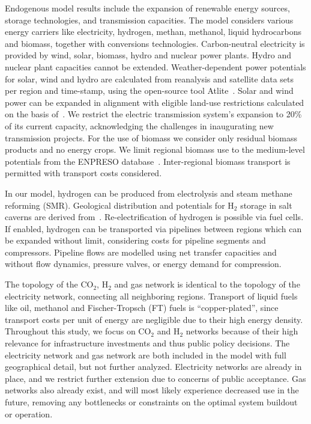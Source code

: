 \documentclass[twocolumn]{article}
\newcommand{\carbon}{CO$_2$}
\newcommand{\hydrogen}{H$_2$}
\begin{document}
Endogenous model results include the expansion of renewable energy sources, storage technologies, and transmission capacities.
The model considers various energy carriers like electricity, hydrogen, methan, methanol, liquid hydrocarbons and biomass, together with conversions technologies.
Carbon-neutral electricity is provided by wind, solar, biomass, hydro and nuclear power plants. Hydro and nuclear plant capacities cannot be extended. Weather-dependent power potentials for solar, wind and hydro are calculated from reanalysis and satellite data sets~\cite{hersbachERA5GlobalReanalysis2020,pfeifrothSurfaceRadiationData2017}  per region and time-stamp, using the open-source tool Atlite~\cite{hofmannAtliteLightweightPython2021}.
Solar and wind power can be expanded in alignment with eligible land-use restrictions calculated on the basis of~\cite{eeaCorineLandCover2012,eeaNatura2000Data2016}. We restrict the electric transmission system's expansion to 20\% of its current capacity, acknowledging the challenges in inaugurating new transmission projects.
For the use of biomass we consider only residual biomass products and no energy crops. We limit regional biomass use to the medium-level potentials from the ENPRESO database~\cite{enspreso_database,instituteforenergyandtransportjointresearchcentreJRCEUTIMESModelBioenergy2015}. Inter-regional biomass transport is permitted with transport costs considered.

In our model, hydrogen can be produced from electrolysis and steam methane reforming (SMR). Geological distribution and potentials for \hydrogen{} storage in salt caverns are derived from~\cite{caglayanTechnicalPotentialSalt2020}. Re-electrification of hydrogen is possible via fuel cells. If enabled, hydrogen can be transported via pipelines between regions which can be expanded without limit, considering costs for pipeline segments and compressors. Pipeline flows are modelled using net transfer capacities and without flow dynamics, pressure valves, or energy demand for compression.

The topology of the \carbon{}, \hydrogen{} and gas network is identical to the topology of the electricity network, connecting all neighboring regions. Transport of liquid fuels like oil, methanol and Fischer-Tropsch (FT) fuels is ``copper-plated'', since transport costs per unit of energy are negligible due to their high energy density. Throughout this study, we focus on \carbon{} and \hydrogen{} networks because of their high relevance for infrastructure investments and thus public policy decisions. The electricity network and gas network are both included in the model with full geographical detail, but not further analyzed. Electricity networks are already in place, and we restrict further extension due to concerns of public acceptance. Gas networks also already exist, and will most likely experience decreased use in the future, removing any bottlenecks or constraints on the optimal system buildout or operation.
\end{document}

